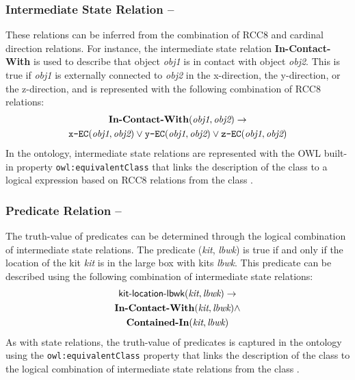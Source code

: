 \subsubsection{Intermediate State Relation --}
These relations can be inferred from the combination of RCC8 and cardinal direction relations. For  instance, the intermediate state relation \textbf{In-Contact-With} is used to describe that object \textit{obj1} is in contact with object \textit{obj2}. This is true if \textit{obj1} is externally connected to \textit{obj2} in the x-direction, the y-direction, or the z-direction,  and is represented with the following combination of RCC8 relations:
\begin{gather}
\textbf{In-Contact-With}(\textit{obj1}, \textit{obj2}) \rightarrow   \notag\\
\texttt{x-EC}(\textit{obj1}, \textit{obj2}) \vee \texttt{y-EC}(\textit{obj1}, \textit{obj2}) \vee \texttt{z-EC}(\textit{obj1},\textit{obj2}) \notag
\end{gather}
In the ontology, intermediate state relations are represented with the OWL built-in property \texttt{owl:equivalentClass} that links the description of the class  to a logical expression based on RCC8 relations from the class .
\subsubsection{Predicate Relation --} The truth-value of predicates can be determined through the logical combination of intermediate state relations. The predicate (\textit{kit}, \textit{lbwk}) is true if and only if the location of the kit \textit{kit} is in the large box with kits \textit{lbwk}. This predicate can be described using the following combination of intermediate state relations:
\begin{gather}
\textsf{kit-location-lbwk}(\textit{kit}, \textit{lbwk}) \rightarrow   \notag\\
\textbf{In-Contact-With}(\textit{kit}, \textit{lbwk}) \wedge \notag\\
\textbf{Contained-In}(\textit{kit}, \textit{lbwk}) \notag
\end{gather}
As with state relations, the truth-value of predicates is captured in the ontology using the \texttt{owl:equivalentClass} property that links the description of the class  to the logical combination of intermediate state relations from the class .
